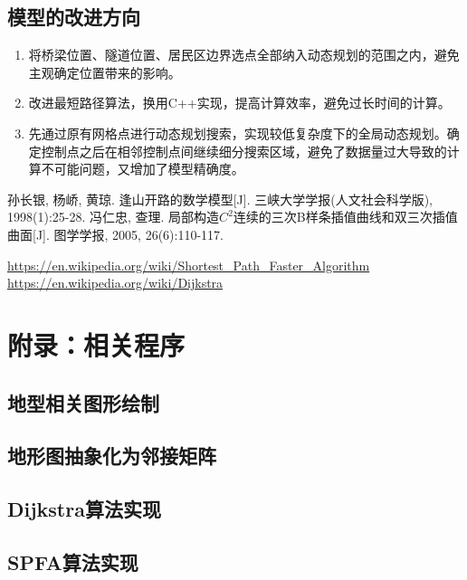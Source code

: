 \documentclass[bwprint]{cumcmthesis}
\begin{document}
\subsection{模型的改进方向}
\begin{enumerate}
	\item 将桥梁位置、隧道位置、居民区边界选点全部纳入动态规划的范围之内，避免主观确定位置带来的影响。
	\item 改进最短路径算法，换用C++实现，提高计算效率，避免过长时间的计算。
	\item 先通过原有网格点进行动态规划搜索，实现较低复杂度下的全局动态规划。确定控制点之后在相邻控制点间继续细分搜索区域，避免了数据量过大导致的计算不可能问题，又增加了模型精确度。

\end{enumerate}






\begin{thebibliography}{9}
  孙长银, 杨峤, 黄琼. 逢山开路的数学模型[J]. 三峡大学学报(人文社会科学版), 1998(1):25-28.
  冯仁忠, 查理. 局部构造$C^2$连续的三次B样条插值曲线和双三次插值曲面[J]. 图学学报, 2005, 26(6):110-117.
 
  \url{https://en.wikipedia.org/wiki/Shortest_Path_Faster_Algorithm}
  \url{https://en.wikipedia.org/wiki/Dijkstra}

\end{thebibliography}

\section{附录：相关程序}
\subsection{地型相关图形绘制}

\subsection{地形图抽象化为邻接矩阵}

\subsection{Dijkstra算法实现}

\subsection{SPFA算法实现}

\end{document}
